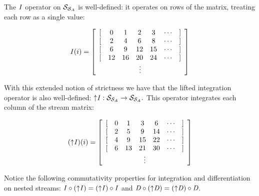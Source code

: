 The $\mathit{I}$ operator on $\mathcal{S}_{\mathcal{S}_{A}}$ is well-defined: it operates on rows
of the matrix, treating each row as a single value:

$$\I(i) = \ssa{0 1 2 3 2 4 6 8 6 9 12 15 12 16 20 24}$$

With this extended notion of strictness we have that the lifted integration operator
is also well-defined: ${\uparrow}\mathit{I}: \mathcal{S}_{\mathcal{S}_{A}} \to \mathcal{S}_{\mathcal{S}_{A}}.$
This operator integrates each column of the stream matrix:

$$(\lift{\I})(i) = \ssa{0 1 3 6 2 5 9 14 4 9 15 22 6 13 21 30}$$

Notice the following commutativity properties for integration and differentiation 
on nested streams: $\mathit{I} \circ ({\uparrow}\mathit{I}) = ({\uparrow}\mathit{I}) \circ \mathit{I}$ and 
$\mathit{D} \circ ({\uparrow}\mathit{D}) = ({\uparrow}\mathit{D}) \circ \mathit{D}$.

